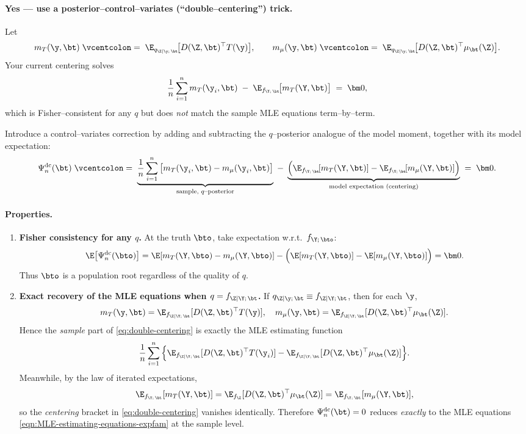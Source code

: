 \paragraph{Yes — use a posterior–control–variates (``double–centering'') trick.}
Let
\[
m_T(\y,\bt)\;\vcentcolon=\;\E_{q_{\Z\mid \y;\,\bt}}\!\big[D(\Z,\bt)^\top T(\y)\big],
\qquad
m_\mu(\y,\bt)\;\vcentcolon=\;\E_{q_{\Z\mid \y;\,\bt}}\!\big[D(\Z,\bt)^\top \mu_\bt(\Z)\big].
\]
Your current centering solves
\[
\frac{1}{n}\sum_{i=1}^n m_T(\y_i,\bt)\;-\;\E_{f_{\Y;\,\bt}}\!\big[m_T(\Y,\bt)\big]\;=\;\bm 0,
\]
which is Fisher–consistent for any $q$ but does \emph{not} match the sample MLE equations term–by–term.

Introduce a control–variates correction by adding and subtracting the $q$–posterior analogue of the model moment, together with its model expectation:
\begin{equation}
\Psi_n^{\mathrm{dc}}(\bt)
\;\vcentcolon=\;
\underbrace{\frac{1}{n}\sum_{i=1}^n\big[m_T(\y_i,\bt)-m_\mu(\y_i,\bt)\big]}_{\text{sample, $q$–posterior}}
\;-\;
\underbrace{\Big(\E_{f_{\Y;\,\bt}}\![m_T(\Y,\bt)]-\E_{f_{\Y;\,\bt}}\![m_\mu(\Y,\bt)]\Big)}_{\text{model expectation (centering)}}
\;=\;\bm 0.
\label{eq:double-centering}
\end{equation}

\paragraph{Properties.}
\begin{enumerate}
\item \textbf{Fisher consistency for any $q$.}
At the truth $\bto$, take expectation w.r.t.\ $f_{\Y;\,\bto}$:
\[
\E\big[\Psi_n^{\mathrm{dc}}(\bto)\big]
=\E[m_T(\Y,\bto)-m_\mu(\Y,\bto)]
-\Big(\E[m_T(\Y,\bto)]-\E[m_\mu(\Y,\bto)]\Big)
=\bm 0.
\]
Thus $\bto$ is a population root regardless of the quality of $q$.

\item \textbf{Exact recovery of the MLE equations when $q=f_{\Z\mid \Y;\,\bt}$.}
If $q_{\Z\mid \y;\,\bt}\equiv f_{\Z\mid \Y;\,\bt}$, then for each $\y$,
\[
m_T(\y,\bt)=\E_{f_{\Z\mid \Y;\,\bt}}[D(\Z,\bt)^\top T(\y)],\quad
m_\mu(\y,\bt)=\E_{f_{\Z\mid \Y;\,\bt}}[D(\Z,\bt)^\top \mu_\bt(\Z)].
\]
Hence the \emph{sample} part of \eqref{eq:double-centering} is exactly the MLE estimating function
\[
\frac{1}{n}\sum_{i=1}^n
\Big\{
\E_{f_{\Z\mid \Y;\,\bt}}[D(\Z,\bt)^\top T(\y_i)]
-
\E_{f_{\Z\mid \Y;\,\bt}}[D(\Z,\bt)^\top \mu_\bt(\Z)]
\Big\}.
\]
Meanwhile, by the law of iterated expectations,
\[
\E_{f_{\Y;\,\bt}}[m_T(\Y,\bt)]=\E_{f_{\Z}}[D(\Z,\bt)^\top \mu_\bt(\Z)]
=\E_{f_{\Y;\,\bt}}[m_\mu(\Y,\bt)],
\]
so the \emph{centering} bracket in \eqref{eq:double-centering} vanishes identically. Therefore
$\Psi_n^{\mathrm{dc}}(\bt)=0$ reduces \emph{exactly} to the MLE equations \eqref{eqn:MLE-estimating-equations-expfam} at the sample level.
\end{enumerate}

